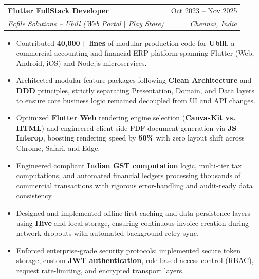 \documentclass[letterpaper,10pt]{article}
\makeatletter
\newcommand{\resumeItem}[1]{
  \item\small{
    {#1 \vspace{-2pt}}
  }
}
\newcommand{\resumeSubheading}[4]{
  \vspace{-2pt}\item
    \begin{tabular*}{0.97\textwidth}[t]{l@{\extracolsep{\fill}}r}
      \textbf{#1} & #2 \\
      \textit{\small#3} & \textit{\small #4} \\
    \end{tabular*}\vspace{-6pt}
}
\newcommand{\resumeItemListStart}{\begin{itemize}}
\newcommand{\resumeItemListEnd}{\end{itemize}\vspace{-5pt}}
\makeatother
\begin{document}
    \resumeSubheading
      {Flutter FullStack Developer}{Oct 2023 -- Nov 2025}
      {Ecfile Solutions -- Ubill (\href{https://app.ubill.tech/}{\underline{Web Portal}} $|$ \href{https://play.google.com/store/apps/details?id=com.ubill.tech}{\underline{Play Store}})}{Chennai, India}
      \resumeItemListStart
        \resumeItem{Contributed \textbf{40,000+ lines} of modular production code for \textbf{Ubill}, a commercial accounting and financial ERP platform spanning Flutter (Web, Android, iOS) and Node.js microservices.}
        \resumeItem{Architected modular feature packages following \textbf{Clean Architecture} and \textbf{DDD} principles, strictly separating Presentation, Domain, and Data layers to ensure core business logic remained decoupled from UI and API changes.}
        \resumeItem{Optimized \textbf{Flutter Web} rendering engine selection (\textbf{CanvasKit vs. HTML}) and engineered client-side PDF document generation via \textbf{JS Interop}, boosting rendering speed by \textbf{50\%} with zero layout shift across Chrome, Safari, and Edge.}
        \resumeItem{Engineered compliant \textbf{Indian GST computation} logic, multi-tier tax computations, and automated financial ledgers processing thousands of commercial transactions with rigorous error-handling and audit-ready data consistency.}
        \resumeItem{Designed and implemented offline-first caching and data persistence layers using \textbf{Hive} and local storage, ensuring continuous invoice creation during network dropouts with automated background retry sync.}
        \resumeItem{Enforced enterprise-grade security protocols: implemented secure token storage, custom \textbf{JWT authentication}, role-based access control (RBAC), request rate-limiting, and encrypted transport layers.}
      \resumeItemListEnd
\end{document}
